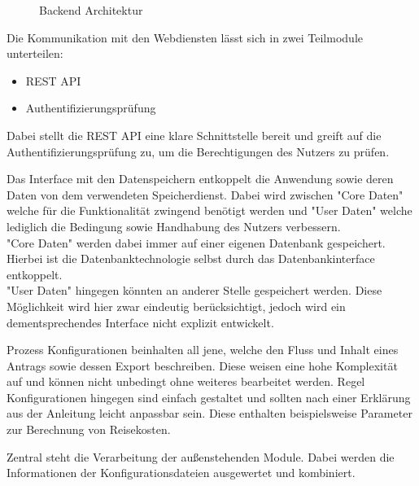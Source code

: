 \begin{figure}[h]
    
    \caption{Backend Architektur}\label{fig:BackendArch}
\end{figure}

Die Kommunikation mit den Webdiensten lässt sich in zwei Teilmodule unterteilen:
\begin{itemize}
    \item \ac{REST} \ac{API}
    \item Authentifizierungsprüfung
\end{itemize}
Dabei stellt die \ac{REST} \ac{API} eine klare Schnittstelle bereit und greift auf die Authentifizierungsprüfung zu,
um die Berechtigungen des Nutzers zu prüfen.

Das Interface mit den Datenspeichern entkoppelt die Anwendung sowie deren Daten von dem verwendeten Speicherdienst.
Dabei wird zwischen "Core Daten" welche für die Funktionalität zwingend benötigt werden
und "User Daten" welche lediglich die Bedingung sowie Handhabung des Nutzers verbessern.\\
"Core Daten" werden dabei immer auf einer eigenen Datenbank gespeichert.
Hierbei ist die Datenbanktechnologie selbst durch das Datenbankinterface entkoppelt.\\
"User Daten" hingegen könnten an anderer Stelle gespeichert werden.
Diese Möglichkeit wird hier zwar eindeutig berücksichtigt, jedoch wird ein dementsprechendes Interface nicht explizit entwickelt.

Prozess Konfigurationen beinhalten all jene, welche den Fluss und Inhalt eines Antrags sowie dessen Export beschreiben.
Diese weisen eine hohe Komplexität auf und können nicht unbedingt ohne weiteres bearbeitet werden.
Regel Konfigurationen hingegen sind einfach gestaltet und sollten nach einer Erklärung aus der Anleitung leicht anpassbar sein.
Diese enthalten beispielsweise Parameter zur Berechnung von Reisekosten.

Zentral steht die Verarbeitung der außenstehenden Module.
Dabei werden die Informationen der Konfigurationsdateien ausgewertet und kombiniert.